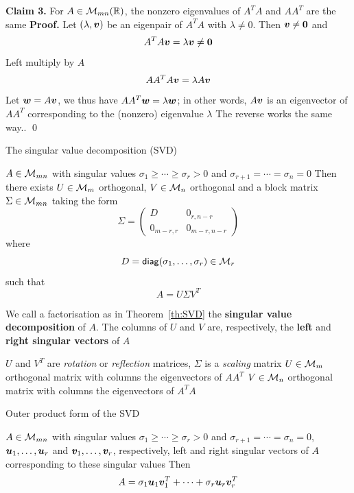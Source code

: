 \documentclass[aspectratio=169]{beamer}\usepackage[]{graphicx}\usepackage[]{xcolor}
\begin{document}
\begin{frame}
\textbf{Claim 3.} For $A\in\mathcal{M}_{mn}(\mathbb{R})$, the nonzero eigenvalues of $A^TA$ and $AA^T$ are the same
\vfill
\textbf{Proof.}
Let $(\lambda,\bm{v})$ be an eigenpair of $A^TA$ with $\lambda\neq 0$. Then $\bv\neq\b0$ and
\[
	A^TA\bv=\lambda\bv\neq\b0
\]
Left multiply by $A$
\[
	AA^TA\bm{v} = \lambda A\bm{v}
\]
Let $\bm{w}=A\bm{v}$, we thus have $AA^T\bm{w}=\lambda\bm{w}$; in other words, $A\bm{v}$ is an eigenvector of $AA^T$ corresponding to the (nonzero) eigenvalue $\lambda$
\vfill
The reverse works the same way.. \qed
\end{frame}


\begin{frame}{The singular value decomposition (SVD)}
\begin{importanttheorem}[SVD]\label{th:SVD}
$A\in\mathcal{M}_{mn}$ with singular values $\sigma_1\geq\cdots\geq\sigma_r>0$ and $\sigma_{r+1}=\cdots=\sigma_n=0$
\vskip0.5cm
Then there exists $U\in\mathcal{M}_m$ orthogonal, $V\in\mathcal{M}_n$ orthogonal and a block matrix $\Sigma\in\mathcal{M}_{mn}$ taking the form
\[
\Sigma=
\begin{pmatrix}
D & 0_{r,n-r} \\
0_{m-r,r} & 0_{m-r,n-r}
\end{pmatrix}
\]
where 
\[
D = \mathsf{diag}(\sigma_1,\ldots,\sigma_r)\in\mathcal{M}_r
\] 
such that
\[
A=U\Sigma V^T
\]
\end{importanttheorem}
\end{frame}


\begin{frame}
\begin{definition}
We call a factorisation as in Theorem~\ref{th:SVD} the \textbf{singular value decomposition} of $A$. The columns of $U$ and $V$ are, respectively, the \textbf{left} and \textbf{right singular vectors} of $A$
\end{definition}
\vfill
$U$ and $V^T$ are \emph{rotation} or \emph{reflection} matrices, $\Sigma$ is a \emph{scaling} matrix
\vfill
$U\in\mathcal{M}_m$ orthogonal matrix with columns the eigenvectors of $AA^T$
\vfill
$V\in\mathcal{M}_n$ orthogonal matrix with columns the eigenvectors of $A^TA$
\end{frame}


\begin{frame}{Outer product form of the SVD}
\begin{theorem}\label{th:SVD_outer_product_form}
$A\in\mathcal{M}_{mn}$ with singular values $\sigma_1\geq\cdots\geq\sigma_r>0$ and $\sigma_{r+1}=\cdots=\sigma_n=0$, $\bm{u}_1,\ldots,\bm{u}_r$ and $\bm{v}_1,\ldots,\bm{v}_r$, respectively, left and right singular vectors of $A$ corresponding to these singular values
\vskip0.5cm
Then 
\[
A=\sigma_1\bm{u}_1\bm{v}_1^T+\cdots+\sigma_r\bm{u}_r\bm{v}_r^T
\]
\end{theorem}
\end{frame}
\end{document}
